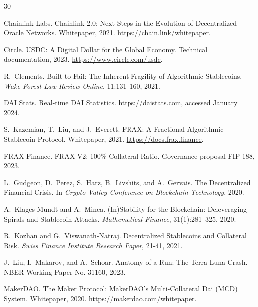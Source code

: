 \documentclass[11pt,a4paper]{article}
\begin{document}
\begin{thebibliography}{30}

Chainlink Labs.
\newblock Chainlink 2.0: Next Steps in the Evolution of Decentralized Oracle Networks.
\newblock Whitepaper, 2021.
\newblock \url{https://chain.link/whitepaper}.

Circle.
\newblock USDC: A Digital Dollar for the Global Economy.
\newblock Technical documentation, 2023.
\newblock \url{https://www.circle.com/usdc}.

R.~Clements.
\newblock Built to Fail: The Inherent Fragility of Algorithmic Stablecoins.
\newblock \emph{Wake Forest Law Review Online}, 11:131--160, 2021.

DAI Stats.
\newblock Real-time DAI Statistics.
\newblock \url{https://daistats.com}, accessed January 2024.

S.~Kazemian, T.~Liu, and J.~Everett.
\newblock FRAX: A Fractional-Algorithmic Stablecoin Protocol.
\newblock Whitepaper, 2021.
\newblock \url{https://docs.frax.finance}.

FRAX Finance.
\newblock FRAX V2: 100\% Collateral Ratio.
\newblock Governance proposal FIP-188, 2023.

L.~Gudgeon, D.~Perez, S.~Harz, B.~Livshits, and A.~Gervais.
\newblock The Decentralized Financial Crisis.
\newblock In \emph{Crypto Valley Conference on Blockchain Technology}, 2020.

A.~Klages-Mundt and A.~Minca.
\newblock (In)Stability for the Blockchain: Deleveraging Spirals and Stablecoin Attacks.
\newblock \emph{Mathematical Finance}, 31(1):281--325, 2020.

R.~Kozhan and G.~Viswanath-Natraj.
\newblock Decentralized Stablecoins and Collateral Risk.
\newblock \emph{Swiss Finance Institute Research Paper}, 21-41, 2021.

J.~Liu, I.~Makarov, and A.~Schoar.
\newblock Anatomy of a Run: The Terra Luna Crash.
\newblock NBER Working Paper No. 31160, 2023.

MakerDAO.
\newblock The Maker Protocol: MakerDAO's Multi-Collateral Dai (MCD) System.
\newblock Whitepaper, 2020.
\newblock \url{https://makerdao.com/whitepaper}.


\end{thebibliography}
\end{document}
